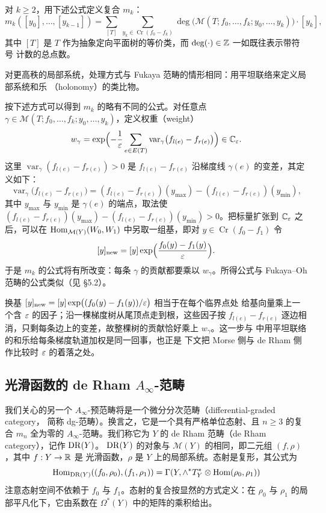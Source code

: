 \begin{dfn}
对 $k\ge2$，用下述公式定义复合 $m_k$：
\[
  m_k([y_0],\dots,[y_{k-1}])=\sum_{[T]}\ \sum_{y_k\in\operatorname{Cr}(f_0-f_k)}
  \deg\bigl(\mathcal{M}(T;f_0,\dots,f_k;y_0,\dots,y_k)\bigr)\cdot[y_k],
\]
其中 $[T]$ 是 $T$ 作为抽象定向平面树的等价类，而 $\deg(\cdot)\in\mathbb{Z}$ 一如既往表示带符号
计数的总点数。
\end{dfn}

对更高秩的局部系统，处理方式与 Fukaya 范畴的情形相同：用平坦联络来定义局部系统和乐
（holonomy）的类比物。

按下述方式可以得到 $m_k$ 的略有不同的公式。对任意点
$\gamma\in\mathcal{M}(T;f_0,\dots,f_k;y_0,\dots,y_k)$，定义权重（weight）
\[
  w_\gamma=\exp\Bigl(-\frac{1}{\varepsilon}\sum_{e\in E(T)}
  \operatorname{var}_\gamma\bigl(f_{l(e)}-f_{r(e)}\bigr)\Bigr)\in\mathbb{C}_{\varepsilon}.
\]
这里 $\operatorname{var}_\gamma(f_{l(e)}-f_{r(e)})>0$ 是 $f_{l(e)}-f_{r(e)}$ 沿梯度线
$\gamma(e)$ 的变差，其定义如下：
\[
  \operatorname{var}_\gamma\bigl(f_{l(e)}-f_{r(e)}\bigr)
  =(f_{l(e)}-f_{r(e)})(y_{\max})-(f_{l(e)}-f_{r(e)})(y_{\min}),
\]
其中 $y_{\max}$ 与 $y_{\min}$ 是 $\gamma(e)$ 的端点，取法使
$(f_{l(e)}-f_{r(e)})(y_{\max})-(f_{l(e)}-f_{r(e)})(y_{\min})>0$。把标量扩张到
$\mathbb{C}_{\varepsilon}$ 之后，可以在 $\operatorname{Hom}_{\mathcal{M}(Y)}(W_0,W_1)$ 中另取一组基，即对
$y\in\operatorname{Cr}(f_0-f_1)$ 令
\[
  [y]_{\mathrm{new}}=[y]\exp\Bigl(\frac{f_0(y)-f_1(y)}{\varepsilon}\Bigr).
\]
于是 $m_k$ 的公式将有所改变：每条 $\gamma$ 的贡献都要乘以 $w_\gamma$。所得公式与
Fukaya--Oh 范畴的公式类似（见 §5.2）。

\begin{yizhu}
换基 $[y]_{\mathrm{new}}=[y]\exp\bigl((f_0(y)-f_1(y))/\varepsilon\bigr)$ 相当于在每个临界点处
给基向量乘上一个含 $\varepsilon$ 的因子；沿一棵梯度树从尾顶点走到根，这些因子按
$f_{l(e)}-f_{r(e)}$ 逐边相消，只剩每条边上的变差，故整棵树的贡献恰好乘上
$w_\gamma$。这一步与 \cite{FuO} 中用平坦联络的和乐给每条梯度轨道加权是同一回事，也正是
下文把 Morse 侧与 de Rham 侧作比较时 $\varepsilon$ 的着落之处。
\end{yizhu}

\subsection{光滑函数的 de Rham $A_\infty$-范畴}

我们关心的另一个 $A_\infty$-预范畴将是一个微分分次范畴（differential-graded category，
简称 dg-范畴）。换言之，它是一个具有严格单位态射、且 $n\ge3$ 的复合 $m_n$ 全为零的
$A_\infty$-范畴。我们称它为 $Y$ 的 de Rham 范畴（de Rham category），记作 $\mathrm{DR}(Y)$。
$\mathrm{DR}(Y)$ 的对象与 $\mathcal{M}(Y)$ 的相同，即二元组 $(f,\rho)$，其中 $f:Y\to\mathbb{R}$ 是
光滑函数，$\rho$ 是 $Y$ 上的局部系统。态射是复形，其公式为
\[
  \operatorname{Hom}_{\mathrm{DR}(Y)}((f_0,\rho_0),(f_1,\rho_1))
  =\Gamma(Y,\wedge^*T_Y^*\otimes\operatorname{Hom}(\rho_0,\rho_1))
\]
注意态射空间不依赖于 $f_0$ 与 $f_1$。态射的复合按显然的方式定义：在 $\rho_0$ 与
$\rho_1$ 的局部平凡化下，它由系数在 $\Omega^*(Y)$ 中的矩阵的乘积给出。


